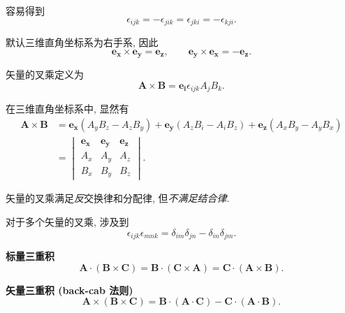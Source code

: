 容易得到
\begin{equation}
    \epsilon_{ijk}=-\epsilon_{jik}=\epsilon_{jki}=-\epsilon_{kji}.
\end{equation}

默认三维直角坐标系为右手系, 因此
\begin{equation}
    \bm{e_x}\times\bm{e_y}=\bm{e_z}, \qquad \bm{e_y}\times\bm{e_x}=-\bm{e_z}.
\end{equation}

矢量的叉乘定义为
\begin{equation}
    \bm{A}\times\bm{B}=\bm{e_i}\epsilon_{ijk}A_jB_k.
\end{equation}

在三维直角坐标系中, 显然有
\begin{equation}
    \begin{aligned}
        \bm{A}\times\bm{B} & =\bm{e_x}(A_yB_z-A_zB_y)+\bm{e_y}(A_zB_i-A_iB_z)+\bm{e_z}(A_xB_y-A_yB_x) \\
                           & =\begin{vmatrix}
                                  \bm{e_x} & \bm{e_y} & \bm{e_z} \\
                                  A_x      & A_y      & A_z      \\
                                  B_x      & B_y      & B_z
                              \end{vmatrix}.
    \end{aligned}
\end{equation}

矢量的叉乘满足\textit{反}交换律和分配律, 但\textit{不满足结合律}.

对于多个矢量的叉乘, 涉及到
\begin{equation}
    \epsilon_{ijk}\epsilon_{mnk}=\delta_{im}\delta_{jn}-\delta_{in}\delta_{jm}.
\end{equation}

\textbf{标量三重积}
\begin{equation}
    \bm{A}\cdot(\bm{B}\times\bm{C})=\bm{B}\cdot(\bm{C}\times\bm{A})=\bm{C}\cdot(\bm{A}\times\bm{B}).
\end{equation}

\textbf{矢量三重积 (back-cab 法则)}
\begin{equation}
    \bm{A}\times(\bm{B}\times\bm{C})=\bm{B}\cdot(\bm{A}\cdot\bm{C})-\bm{C}\cdot(\bm{A}\cdot\bm{B}).
\end{equation}
